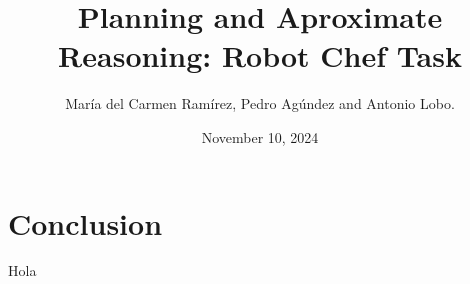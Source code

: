 \documentclass{article}
\title{Planning and Aproximate Reasoning: Robot Chef Task}
\author{
	María del Carmen Ramírez, Pedro Agúndez and Antonio Lobo.
}
\date{November 10, 2024}
\begin{document}
	
	\maketitle

 

 


\section{Conclusion}
Hola\cite{key}



\end{document}
